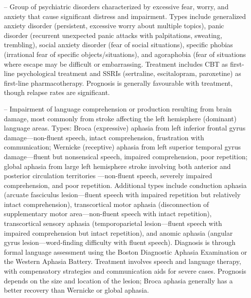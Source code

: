 -- Group of psychiatric disorders characterized by excessive fear, worry, and anxiety that cause significant distress and impairment. Types include generalized anxiety disorder (persistent, excessive worry about multiple topics), panic disorder (recurrent unexpected panic attacks with palpitations, sweating, trembling), social anxiety disorder (fear of social situations), specific phobias (irrational fear of specific objects/situations), and agoraphobia (fear of situations where escape may be difficult or embarrassing. Treatment includes CBT as first-line psychological treatment and SSRIs (sertraline, escitalopram, paroxetine) as first-line pharmacotherapy. Prognosis is generally favourable with treatment, though relapse rates are significant.

-- Impairment of language comprehension or production resulting from brain damage, most commonly from stroke affecting the left hemisphere (dominant) language areas. Types: Broca (expressive) aphasia from left inferior frontal gyrus damage—non-fluent speech, intact comprehension, frustration with communication; Wernicke (receptive) aphasia from left superior temporal gyrus damage—fluent but nonsensical speech, impaired comprehension, poor repetition; global aphasia from large left hemisphere stroke involving both anterior and posterior circulation territories —non-fluent speech, severely impaired comprehension, and poor repetition. Additional types include conduction aphasia (arcuate fasciculus lesion—fluent speech with impaired repetition but relatively intact comprehension), transcortical motor aphasia (disconnection of supplementary motor area—non-fluent speech with intact repetition), transcortical sensory aphasia (temporoparietal lesion—fluent speech with impaired comprehension but intact repetition), and anomic aphasia (angular gyrus lesion—word-finding difficulty with fluent speech). Diagnosis is through formal language assessment using the Boston Diagnostic Aphasia Examination or the Western Aphasia Battery. Treatment involves speech and language therapy, with compensatory strategies and communication aids for severe cases. Prognosis depends on the size and location of the lesion; Broca aphasia generally has a better recovery than Wernicke or global aphasia.


